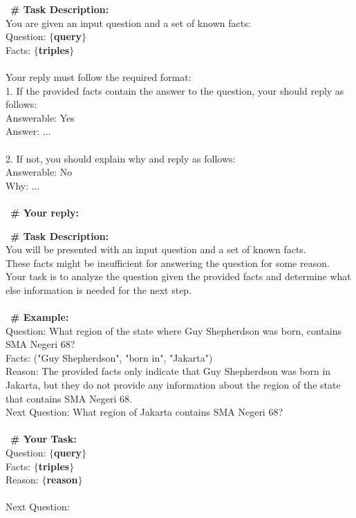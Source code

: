 \begin{prompt}[title={Reasoning for Termination}]
\ \textbf{\# Task Description:} \\
You are given an input question and a set of known facts:\\
Question: \textbf{$\{$query$\}$} \\
Facts: \textbf{$\{$triples$\}$} \\
\\
Your reply must follow the required format:\\
1. If the provided facts contain the answer to the question, your should reply as follows:\\
Answerable: Yes\\
Answer: ...\\
\\
2. If not, you should explain why and reply as follows:\\
Answerable: No\\
Why: ...\\
\\
\ \textbf{\# Your reply:} \\
\end{prompt}


\begin{prompt}[title={Query Re-writing}]
\ \textbf{\# Task Description:} \\
You will be presented with an input question and a set of known facts. \\
These facts might be insufficient for answering the question for some reason. \\
Your task is to analyze the question given the provided facts and 
determine what else information is needed for the next step. \\
\\
\ \textbf{\# Example:} \\
Question: What region of the state where Guy Shepherdson was born, contains SMA Negeri 68?\\
Facts: ("Guy Shepherdson", "born in", "Jakarta")\\
Reason: The provided facts only indicate that Guy Shepherdson was born in Jakarta, but they do not provide any information about the region of the state that contains SMA Negeri 68. \\
Next Question: What region of Jakarta contains SMA Negeri 68? \\
\\
\ \textbf{\# Your Task:} \\
Question: \textbf{$\{$query$\}$} \\
Facts: \textbf{$\{$triples$\}$} \\
Reason: \textbf{$\{$reason$\}$} \\
\\
Next Question:
\end{prompt}

